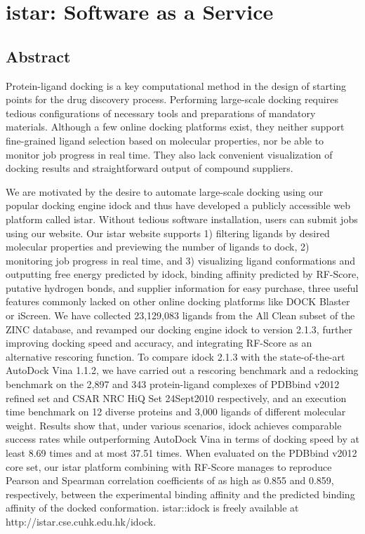 \chapter{istar: Software as a Service}

\section{Abstract}

Protein-ligand docking is a key computational method in the design of starting points for the drug discovery process. Performing large-scale docking requires tedious configurations of necessary tools and preparations of mandatory materials. Although a few online docking platforms exist, they neither support fine-grained ligand selection based on molecular properties, nor be able to monitor job progress in real time. They also lack convenient visualization of docking results and straightforward output of compound suppliers.

We are motivated by the desire to automate large-scale docking using our popular docking engine idock and thus have developed a publicly accessible web platform called istar. Without tedious software installation, users can submit jobs using our website. Our istar website supports 1) filtering ligands by desired molecular properties and previewing the number of ligands to dock, 2) monitoring job progress in real time, and 3) visualizing ligand conformations and outputting free energy predicted by idock, binding affinity predicted by RF-Score, putative hydrogen bonds, and supplier information for easy purchase, three useful features commonly lacked on other online docking platforms like DOCK Blaster or iScreen. We have collected 23,129,083 ligands from the All Clean subset of the ZINC database, and revamped our docking engine idock to version 2.1.3, further improving docking speed and accuracy, and integrating RF-Score as an alternative rescoring function. To compare idock 2.1.3 with the state-of-the-art AutoDock Vina 1.1.2, we have carried out a rescoring benchmark and a redocking benchmark on the 2,897 and 343 protein-ligand complexes of PDBbind v2012 refined set and CSAR NRC HiQ Set 24Sept2010 respectively, and an execution time benchmark on 12 diverse proteins and 3,000 ligands of different molecular weight. Results show that, under various scenarios, idock achieves comparable success rates while outperforming AutoDock Vina in terms of docking speed by at least 8.69 times and at most 37.51 times. When evaluated on the PDBbind v2012 core set, our istar platform combining with RF-Score manages to reproduce Pearson and Spearman correlation coefficients of as high as 0.855 and 0.859, respectively, between the experimental binding affinity and the predicted binding affinity of the docked conformation. istar::idock is freely available at http://istar.cse.cuhk.edu.hk/idock.

